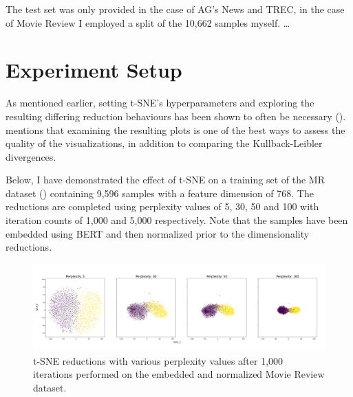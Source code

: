 \documentclass[english,bachelor,ul]{webisthesis} %
\begin{document}
The test set was only provided in the case of AG's News and TREC, in the case of Movie Review I employed a split of the 10,662 samples myself. \dots


\section{Experiment Setup}

As mentioned earlier, setting t-SNE's hyperparameters and exploring the resulting differing reduction behaviours has been shown to often be necessary (\cite{wattenberg2016how}). \cite{vanHomepage} mentions that examining the resulting plots is one of the best ways to assess the quality of the visualizations, in addition to comparing the Kullback-Leibler divergences. 

Below, I have demonstrated the effect of t-SNE on a training set of the MR dataset (\cite{DBLP:conf/acl/PangL05}) containing 9,596 samples with a feature dimension of 768. The reductions are completed using perplexity values of 5, 30, 50 and 100 with iteration counts of 1,000 and 5,000 respectively. Note that the samples have been embedded using BERT and then normalized prior to the dimensionality reductions.

\iffalse
\begin{figure}[htbp]
    \centering
    \includegraphics[width=1\textwidth]{img/reductions-mr-1000.jpg}
    \caption{t-SNE reductions with various perplexity values after 1,000 iterations performed on the embedded and normalized Movie Review dataset.}
    \label{fig:reductions-mr-1000}
\end{figure}
\end{document}
